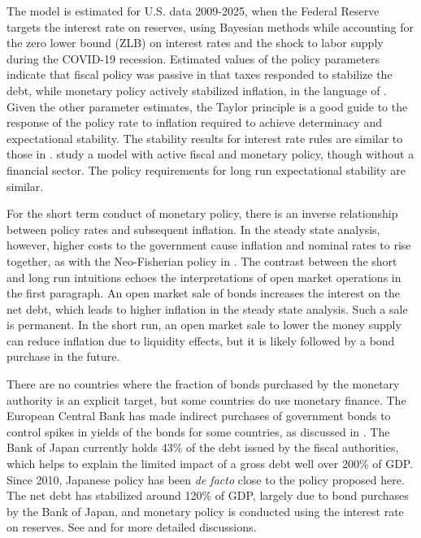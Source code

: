 \documentclass[]{article}
\begin{document}
The model is estimated for U.S. data 2009-2025, when the Federal Reserve targets the interest rate on reserves, using Bayesian methods while accounting for the zero lower bound (ZLB) on interest rates and the shock to labor supply during the COVID-19 recession. Estimated values of the policy parameters indicate that fiscal policy was passive in that taxes responded to stabilize the debt, while monetary policy actively stabilized inflation, in the language of \textcite{leeper1991active}. Given the other parameter estimates, the Taylor principle is a good guide to the response of the policy rate to inflation required to achieve determinacy and expectational stability.
The stability results for interest rate rules are similar to those in \textcite{bullardmitra02}. \textcite{eusepi2018fiscal} study a model with active fiscal and monetary policy, though without a financial sector. The policy requirements for long run expectational stability are similar. 

For the short term conduct of monetary policy, there is an inverse relationship between policy rates and subsequent inflation. In the steady state analysis, however, higher costs to the government cause inflation and nominal rates to rise together, as with the Neo-Fisherian policy in \textcite{cochrane2023NeoFisher}. The contrast between the short and long run intuitions echoes the interpretations of open market operations in the first paragraph. An open market sale of bonds increases the interest on the net debt, which leads to higher inflation in the steady state analysis. Such a sale is permanent. In the short run, an open market sale to lower the money supply can reduce inflation due to liquidity effects, but it is likely followed by a bond purchase in the future.

There are no countries where the fraction of bonds purchased by the monetary authority is an explicit target, but some countries do use monetary finance. The European Central Bank has made indirect purchases of government bonds to control spikes in yields of the bonds for some countries, as discussed in \textcite{Attavila2015OMT}. The Bank of Japan currently holds 43\% of the debt issued by the fiscal authorities, which helps to explain the limited impact of a gross debt well over 200\% of GDP. Since 2010, Japanese policy has been \textit{de facto} close to the policy proposed here. The net debt has stabilized around 120\% of GDP, largely due to bond purchases by the Bank of Japan, and monetary policy is conducted using the interest rate on reserves. See \textcite{Hansen2023JapanDebt} and \textcite{waters2024potentiallypleasant} for more detailed discussions.
\end{document}
